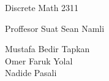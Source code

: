 \documentclass[11pt]{article}
\begin{document}
\begin{center}
Discrete Math 2311
\end{center}

\begin{center}
Proffesor Suat Sean Namli\\
\end{center}

\begin{center}
Mustafa Bedir Tapkan\\
Omer Faruk Yolal\\
Nadide Pasali\\
\end{center}

\newpage
\end{document}
